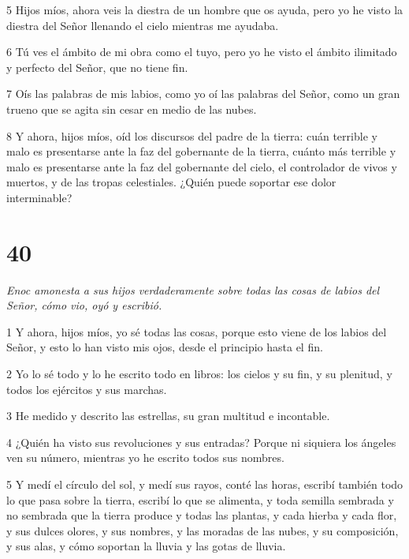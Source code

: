 \par 5 Hijos míos, ahora veis la diestra de un hombre que os ayuda, pero yo he visto la diestra del Señor llenando el cielo mientras me ayudaba.

\par 6 Tú ves el ámbito de mi obra como el tuyo, pero yo he visto el ámbito ilimitado y perfecto del Señor, que no tiene fin.

\par 7 Oís las palabras de mis labios, como yo oí las palabras del Señor, como un gran trueno que se agita sin cesar en medio de las nubes.

\par 8 Y ahora, hijos míos, oíd los discursos del padre de la tierra: cuán terrible y malo es presentarse ante la faz del gobernante de la tierra, cuánto más terrible y malo es presentarse ante la faz del gobernante del cielo, el controlador de vivos y muertos, y de las tropas celestiales. ¿Quién puede soportar ese dolor interminable?

\chapter{40}

\par \textit{Enoc amonesta a sus hijos verdaderamente sobre todas las cosas de labios del Señor, cómo vio, oyó y escribió.}

\par 1 Y ahora, hijos míos, yo sé todas las cosas, porque esto viene de los labios del Señor, y esto lo han visto mis ojos, desde el principio hasta el fin.

\par 2 Yo lo sé todo y lo he escrito todo en libros: los cielos y su fin, y su plenitud, y todos los ejércitos y sus marchas.

\par 3 He medido y descrito las estrellas, su gran multitud e incontable.

\par 4 ¿Quién ha visto sus revoluciones y sus entradas? Porque ni siquiera los ángeles ven su número, mientras yo he escrito todos sus nombres.

\par 5 Y medí el círculo del sol, y medí sus rayos, conté las horas, escribí también todo lo que pasa sobre la tierra, escribí lo que se alimenta, y toda semilla sembrada y no sembrada que la tierra produce y todas las plantas, y cada hierba y cada flor, y sus dulces olores, y sus nombres, y las moradas de las nubes, y su composición, y sus alas, y cómo soportan la lluvia y las gotas de lluvia.

